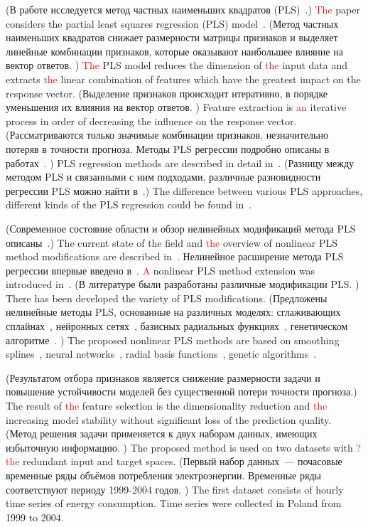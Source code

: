\documentclass[12pt,twoside]{article}
\begin{document}
(В работе исследуется метод частных наименьших квадратов (PLS)~\cite{wegelin2000survey,abdi2003pls,geladi1986partial}.)
\textcolor{red}{The} paper considers the partial least squares regression (PLS) model~\cite{wegelin2000survey,abdi2003pls,geladi1986partial}.
(Метод частных наименьших квадратов снижает размерности матрицы признаков и выделяет линейные комбинации признаков, которые оказывают наибольшее влияние на вектор ответов. )
\textcolor{red}{The} PLS model reduces the dimension of \textcolor{red}{the} input data and extracts \textcolor{red}{the} linear combination of features which have the greatest impact on the response vector.
(Выделение признаков происходит итеративно, в порядке уменьшения их влияния на вектор ответов. )
Feature extraction is \textcolor{red}{an} iterative process in order of decreasing the influence on the response vector.
(Рассматриваются только значимые комбинации признаков, незначительно потеряв в точности прогноза.
Методы PLS регрессии подробно описаны в работах~\cite{geladi1988pls, hoskuldsson1988plsr,de1993simpls}. )
PLS regression methods are described in detail in~\cite{geladi1988pls, hoskuldsson1988plsr,de1993simpls}.
(Разницу между методом PLS и связанными с ним подходами, различные разновидности регрессии PLS можно найти в~\cite{rosipal2006overview}.)
The difference between various PLS approaches, different kinds of the PLS regression could be found in~\cite{rosipal2006overview}.

(Современное состояние области и обзор нелинейных модификаций метода PLS описаны~\cite{rosipal2011npls}.)
The current state of the field and \textcolor{red}{the} overview of nonlinear PLS method modifications are described in~\cite{rosipal2011npls}.
Нелинейное расширение метода PLS регрессии впервые введено в~\cite{wold1989nonlinear}. 
\textcolor{red}{A} nonlinear PLS method extension was introduced in~\cite{wold1989nonlinear}.
(В литературе были разработаны различные модификации PLS. )
There has been developed the variety of PLS modifications.
(Предложены нелинейные методы PLS, основанные на различных моделях: 
сглаживающих сплайнах~\cite{frank1990npls}, нейронных сетях~\cite{qin1992npls}, базисных радиальных функциях~\cite{yan2003geneticpls}, генетическом алгоритме~\cite{hiden1998geneticpls}. )
The proposed nonlinear PLS methods are based on smoothing splines~\cite{frank1990npls}, neural networks~\cite{qin1992npls}, radial basis functions~\cite{yan2003geneticpls}, genetic algorithms~\cite{hiden1998geneticpls}.

(Результатом отбора признаков является снижение размерности задачи и повышение устойчивости моделей без существенной потери точности прогноза.)
The result of \textcolor{red}{the} feature selection is the dimensionality reduction and \textcolor{red}{the} increasing model stability without significant loss of the prediction quality.
(Метод решения задачи применяется к двух наборам данных, имеющих избыточную информацию. )
The proposed method is used on two datasets with \textcolor{red}{? the} redundant input and target spaces.
(Первый набор данных~--- почасовые временные ряды объёмов потребления электроэнергии. 
Временные ряды соответствуют периоду 1999-2004 годов. )
The first dataset consists of hourly time series of energy consumption. 
Time series were collected in Poland from 1999 to 2004.
\end{document}
